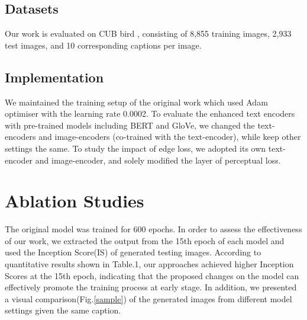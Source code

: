 \documentclass[10pt,twocolumn,letterpaper]{article}
\begin{document}
\subsection{Datasets}
Our work is evaluated on CUB bird  \cite{WelinderEtal2010}, consisting of 8,855 training images, 2,933 test images, and 10 corresponding captions per image. 

\subsection{Implementation}
We maintained the training setup of the original work which used Adam optimiser with the learning rate 0.0002. To evaluate the enhanced text encoders with pre-trained models including BERT and GloVe, we changed the text-encoders and image-encoders (co-trained with the text-encoder), while keep other settings the same. To study the impact of edge loss, we adopted its own text-encoder and image-encoder, and solely modified the layer of perceptual loss.  

\section{Ablation Studies}
\noindent The original model was trained for 600 epochs. In order to assess the effectiveness of our work, we extracted the output from the 15th epoch of each model and used the Inception Score(IS) \cite{salimans2016improved} of generated testing images. According to quantitative results shown in Table.1, our approaches achieved higher Inception Scores at the 15th epoch, indicating that the proposed changes on the model can effectively promote the training process at early stage. In addition, we presented a visual comparison(Fig.\ref{sample}) of the generated images from different model settings given the same caption. 
\\\\
\end{document}
